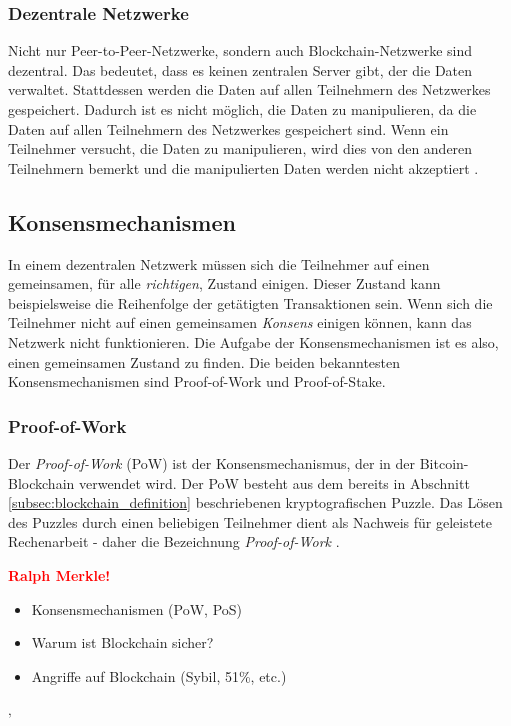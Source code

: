 \subsubsection{Dezentrale Netzwerke}

Nicht nur Peer-to-Peer-Netzwerke, sondern auch Blockchain-Netzwerke sind dezentral. Das bedeutet, dass es keinen zentralen Server gibt, der die Daten verwaltet. Stattdessen werden die Daten auf allen Teilnehmern des Netzwerkes gespeichert. Dadurch ist es nicht möglich, die Daten zu manipulieren, da die Daten auf allen Teilnehmern des Netzwerkes gespeichert sind. Wenn ein Teilnehmer versucht, die Daten zu manipulieren, wird dies von den anderen Teilnehmern bemerkt und die manipulierten Daten werden nicht akzeptiert \parencite[S. 10]{Fill_BlockchainGrundlagen}. 

\subsection{Konsensmechanismen}

In einem dezentralen Netzwerk müssen sich die Teilnehmer auf einen gemeinsamen, für alle \textit{richtigen}, Zustand einigen. Dieser Zustand kann beispielsweise die Reihenfolge der getätigten Transaktionen sein. Wenn sich die Teilnehmer nicht auf einen gemeinsamen \textit{Konsens} einigen können, kann das Netzwerk nicht funktionieren. Die Aufgabe der Konsensmechanismen ist es also, einen gemeinsamen Zustand zu finden. Die beiden bekanntesten Konsensmechanismen sind Proof-of-Work und Proof-of-Stake.

\subsubsection{Proof-of-Work}

Der \textit{Proof-of-Work} (PoW) ist der Konsensmechanismus, der in der Bitcoin-Blockchain verwendet wird. Der PoW besteht aus dem bereits in Abschnitt \ref{subsec:blockchain_definition}  beschriebenen kryptografischen Puzzle. Das Lösen des Puzzles durch einen beliebigen Teilnehmer dient als Nachweis für geleistete Rechenarbeit - daher die Bezeichnung \textit{Proof-of-Work} \parencite[S. 27]{Brünnler_BlockchainKurzGut}. 


\textbf{\textcolor{red}{Ralph Merkle!}}
\begin{itemize}
    \item Konsensmechanismen (PoW, PoS)
    \item Warum ist Blockchain sicher?
    \item Angriffe auf Blockchain (Sybil, 51\%, etc.)
\end{itemize}


‚